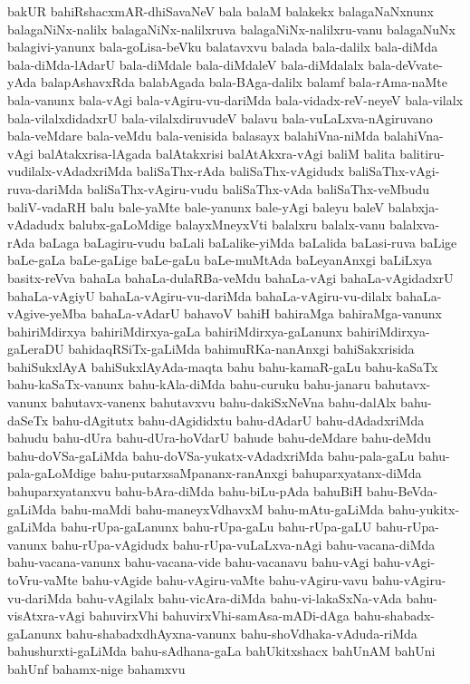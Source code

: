 {bakUR
bahiRshacxmAR-dhiSavaNeV
bala
balaM
balakekx
balagaNaNxnunx
balagaNiNx-nalilx
balagaNiNx-nalilxruva
balagaNiNx-nalilxru-vanu
balagaNuNx
balagivi-yanunx
bala-goLisa-beVku
balatavxvu
balada
bala-dalilx
bala-diMda
bala-diMda-lAdarU
bala-diMdale
bala-diMdaleV
bala-diMdalalx
bala-deVvate-yAda
balapAshavxRda
balabAgada
bala-BAga-dalilx
balamf
bala-rAma-naMte
bala-vanunx
bala-vAgi
bala-vAgiru-vu-dariMda
bala-vidadx-reV-neyeV
bala-vilalx
bala-vilalxdidadxrU
bala-vilalxdiruvudeV
balavu
bala-vuLaLxva-nAgiruvano
bala-veMdare
bala-veMdu
bala-venisida
balasayx
balahiVna-niMda
balahiVna-vAgi
balAtakxrisa-lAgada
balAtakxrisi
balAtAkxra-vAgi
baliM
balita
balitiru-vudilalx-vAdadxriMda
baliSaThx-rAda
baliSaThx-vAgidudx
baliSaThx-vAgi-ruva-dariMda
baliSaThx-vAgiru-vudu
baliSaThx-vAda
baliSaThx-veMbudu
baliV-vadaRH
balu
bale-yaMte
bale-yanunx
bale-yAgi
baleyu
baleV
balabxja-vAdadudx
balubx-gaLoMdige
balayxMneyxVti
balalxru
balalx-vanu
balalxva-rAda
baLaga
baLagiru-vudu
baLali
baLalike-yiMda
baLalida
baLasi-ruva
baLige
baLe-gaLa
baLe-gaLige
baLe-gaLu
baLe-muMtAda
baLeyanAnxgi
baLiLxya
basitx-reVva
bahaLa
bahaLa-dulaRBa-veMdu
bahaLa-vAgi
bahaLa-vAgidadxrU
bahaLa-vAgiyU
bahaLa-vAgiru-vu-dariMda
bahaLa-vAgiru-vu-dilalx
bahaLa-vAgive-yeMba
bahaLa-vAdarU
bahavoV
bahiH
bahiraMga
bahiraMga-vanunx
bahiriMdirxya
bahiriMdirxya-gaLa
bahiriMdirxya-gaLanunx
bahiriMdirxya-gaLeraDU
bahidaqRSiTx-gaLiMda
bahimuRKa-nanAnxgi
bahiSakxrisida
bahiSukxlAyA
bahiSukxlAyAda-maqta
bahu
bahu-kamaR-gaLu
bahu-kaSaTx
bahu-kaSaTx-vanunx
bahu-kAla-diMda
bahu-curuku
bahu-janaru
bahutavx-vanunx
bahutavx-vanenx
bahutavxvu
bahu-dakiSxNeVna
bahu-dalAlx
bahu-daSeTx
bahu-dAgitutx
bahu-dAgididxtu
bahu-dAdarU
bahu-dAdadxriMda
bahudu
bahu-dUra
bahu-dUra-hoVdarU
bahude
bahu-deMdare
bahu-deMdu
bahu-doVSa-gaLiMda
bahu-doVSa-yukatx-vAdadxriMda
bahu-pala-gaLu
bahu-pala-gaLoMdige
bahu-putarxsaMpananx-ranAnxgi
bahuparxyatanx-diMda
bahuparxyatanxvu
bahu-bAra-diMda
bahu-biLu-pAda
bahuBiH
bahu-BeVda-gaLiMda
bahu-maMdi
bahu-maneyxVdhavxM
bahu-mAtu-gaLiMda
bahu-yukitx-gaLiMda
bahu-rUpa-gaLanunx
bahu-rUpa-gaLu
bahu-rUpa-gaLU
bahu-rUpa-vanunx
bahu-rUpa-vAgidudx
bahu-rUpa-vuLaLxva-nAgi
bahu-vacana-diMda
bahu-vacana-vanunx
bahu-vacana-vide
bahu-vacanavu
bahu-vAgi
bahu-vAgi-toVru-vaMte
bahu-vAgide
bahu-vAgiru-vaMte
bahu-vAgiru-vavu
bahu-vAgiru-vu-dariMda
bahu-vAgilalx
bahu-vicAra-diMda
bahu-vi-lakaSxNa-vAda
bahu-visAtxra-vAgi
bahuvirxVhi
bahuvirxVhi-samAsa-mADi-dAga
bahu-shabadx-gaLanunx
bahu-shabadxdhAyxna-vanunx
bahu-shoVdhaka-vAduda-riMda
bahushurxti-gaLiMda
bahu-sAdhana-gaLa
bahUkitxshacx
bahUnAM
bahUni
bahUnf
bahamx-nige
bahamxvu
}
